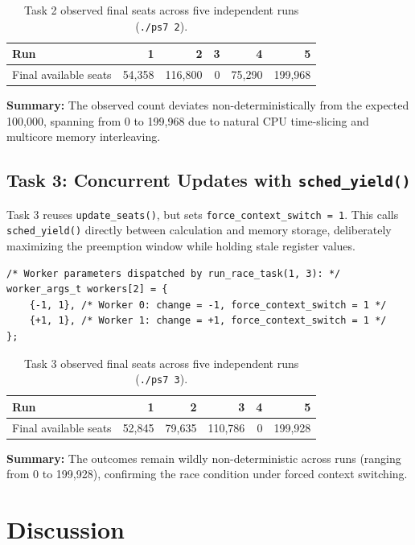 \documentclass[a4paper,10pt]{article}
\begin{document}
\begin{table}[H]
\centering
\footnotesize
\caption{Task 2 observed final seats across five independent runs (\texttt{./ps7 2}).}
\begin{tabular}{lrrrrr}
\toprule
Run & 1 & 2 & 3 & 4 & 5 \\
\midrule
Final available seats & 54,358 & 116,800 & 0 & 75,290 & 199,968 \\
\bottomrule
\end{tabular}
\end{table}
\noindent\textbf{Summary:} The observed count deviates non-deterministically from the expected 100,000, spanning from 0 to 199,968 due to natural CPU time-slicing and multicore memory interleaving.

\subsection{Task 3: Concurrent Updates with \texttt{sched\_yield()}}
Task 3 reuses \texttt{update\_seats()}, but sets \texttt{force\_context\_switch = 1}. This calls \texttt{sched\_yield()} directly between calculation and memory storage, deliberately maximizing the preemption window while holding stale register values.

\begin{lstlisting}[caption={Task 3: Worker configuration with voluntary yield enabled}]
/* Worker parameters dispatched by run_race_task(1, 3): */
worker_args_t workers[2] = {
    {-1, 1}, /* Worker 0: change = -1, force_context_switch = 1 */
    {+1, 1}, /* Worker 1: change = +1, force_context_switch = 1 */
};
\end{lstlisting}

\begin{table}[H]
\centering
\footnotesize
\caption{Task 3 observed final seats across five independent runs (\texttt{./ps7 3}).}
\begin{tabular}{lrrrrr}
\toprule
Run & 1 & 2 & 3 & 4 & 5 \\
\midrule
Final available seats & 52,845 & 79,635 & 110,786 & 0 & 199,928 \\
\bottomrule
\end{tabular}
\end{table}
\noindent\textbf{Summary:} The outcomes remain wildly non-deterministic across runs (ranging from 0 to 199,928), confirming the race condition under forced context switching.

\clearpage

\section{Discussion}
\end{document}
